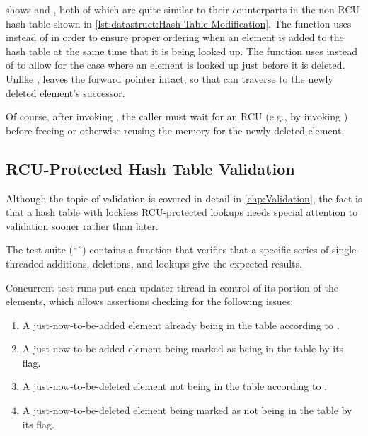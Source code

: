\begin{listing}

\caption{RCU-Protected Hash-Table Modification}
\label{lst:datastruct:RCU-Protected Hash-Table Modification}
\end{listing}

shows  and , both of which
are quite similar to their counterparts in the non-RCU hash table
shown in
\cref{lst:datastruct:Hash-Table Modification}.
The  function uses  instead
of  in order to ensure proper ordering when
an element is added to the hash table at the same time that it is
being looked up.
The  function uses  instead
of  to allow for the case where an element is
looked up just before it is deleted.
Unlike ,  leaves the
forward pointer intact, so that  can traverse
to the newly deleted element's successor.

Of course, after invoking , the caller must wait for
an RCU  (e.g., by invoking ) before
freeing or otherwise reusing the memory for the newly deleted element.

\subsection{RCU-Protected Hash Table Validation}
\label{sec:datastruct:RCU-Protected Hash Table Validation}

Although the topic of validation is covered in detail in
\cref{chp:Validation}, the fact is that a hash table with lockless
RCU-protected lookups needs special attention to validation sooner rather
than later.

The test suite (``'') contains a 
function that verifies that a specific series of single-threaded
additions, deletions, and lookups give the expected results.

Concurrent test runs put each updater thread in control of its portion of
the elements, which allows assertions checking for the following issues:

\begin{enumerate}
\item	A just-now-to-be-added element already being in the table
	according to .
\item	A just-now-to-be-added element being marked as being in the
	table by its  flag.
\item	A just-now-to-be-deleted element not being in the table according
	to .
\item	A just-now-to-be-deleted element being marked as not being in
	the table by its  flag.
\end{enumerate}

